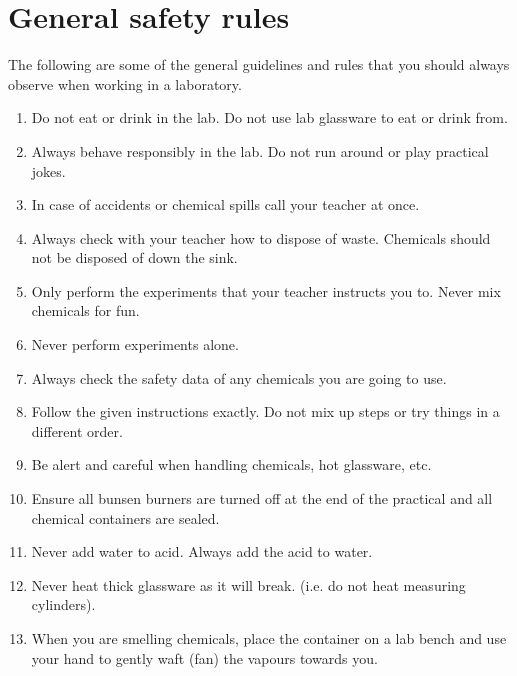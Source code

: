 \section{ General safety rules}
            \nopagebreak
\label{m38491*id7342}The following are some of the general guidelines and rules that you should always observe when working in a laboratory.
\label{m38491*id634222}\begin{enumerate}[noitemsep, label=\textbf{\arabic*}. ] 
            \label{m38491*id632}\item Do not eat or drink in the lab. Do not use lab glassware to eat or drink from.
\label{m38491*id6124}\item Always behave responsibly in the lab. Do not run around or play practical jokes.
\label{m38491*id6342}\item In case of accidents or chemical spills call your teacher at once.
\label{m38491*id7324}\item Always check with your teacher how to dispose of waste. Chemicals should not be disposed of down the sink.
\label{m38491*id632324}\item Only perform the experiments that your teacher instructs you to. Never mix chemicals for fun.
\label{m38491*id6242313}\item Never perform experiments alone. 
\label{m38491*id5512}\item Always check the safety data of any chemicals you are going to use. 
\label{m38491*id523465}\item Follow the given instructions exactly. Do not mix up steps or try things in a different order.
\label{m38491*id73221}\item Be alert and careful when handling chemicals, hot glassware, etc.  
\label{m38491*id5621}\item Ensure all bunsen burners are turned off at the end of the practical and all chemical containers are sealed.
\item Never add water to acid. Always add the acid to water.
\item Never heat thick glassware as it will break. (i.e. do not heat measuring cylinders).
\item When you are smelling chemicals, place the container on a lab bench and use your hand to gently waft (fan) the vapours towards you.

\end{enumerate}
